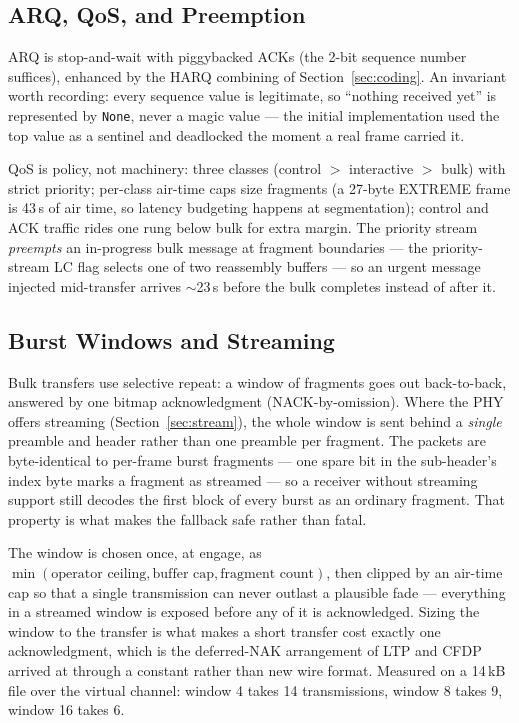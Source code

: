 \subsection{ARQ, QoS, and Preemption}

ARQ is stop-and-wait with piggybacked ACKs (the 2-bit sequence number
suffices), enhanced by the HARQ combining of Section~\ref{sec:coding}.
An invariant worth recording: every sequence value is legitimate, so
``nothing received yet'' is represented by \texttt{None}, never a
magic value --- the initial implementation used the top value as a
sentinel and deadlocked the moment a real frame carried it.

QoS is policy, not machinery: three classes (control $>$ interactive
$>$ bulk) with strict priority; per-class air-time caps size fragments
(a 27-byte EXTREME frame is 43\,s of air time, so latency budgeting
happens at segmentation); control and ACK traffic rides one rung below
bulk for extra margin.  The priority stream \emph{preempts} an
in-progress bulk message at fragment boundaries --- the
priority-stream LC flag selects one of two reassembly buffers --- so
an urgent message injected mid-transfer arrives $\sim$23\,s before the
bulk completes instead of after it.

\subsection{Burst Windows and Streaming}
\label{sec:burstwin}

Bulk transfers use selective repeat: a window of fragments goes out
back-to-back, answered by one bitmap acknowledgment
(NACK-by-omission).  Where the PHY offers streaming
(Section~\ref{sec:stream}), the whole window is sent behind a
\emph{single} preamble and header rather than one preamble per
fragment.  The packets are byte-identical to per-frame burst fragments
--- one spare bit in the sub-header's index byte marks a fragment as
streamed --- so a receiver without streaming support still decodes the
first block of every burst as an ordinary fragment.  That property is
what makes the fallback safe rather than fatal.

The window is chosen once, at engage, as
$\min(\text{operator ceiling}, \text{buffer cap},
\text{fragment count})$, then clipped by an air-time cap so that a
single transmission can never outlast a plausible fade --- everything
in a streamed window is exposed before any of it is acknowledged.
Sizing the window to the transfer is what makes a short transfer cost
exactly one acknowledgment, which is the deferred-NAK arrangement of
LTP and CFDP arrived at through a constant rather than new wire
format.  Measured on a 14\,kB file over the virtual channel: window 4
takes 14 transmissions, window 8 takes 9, window 16 takes 6.

